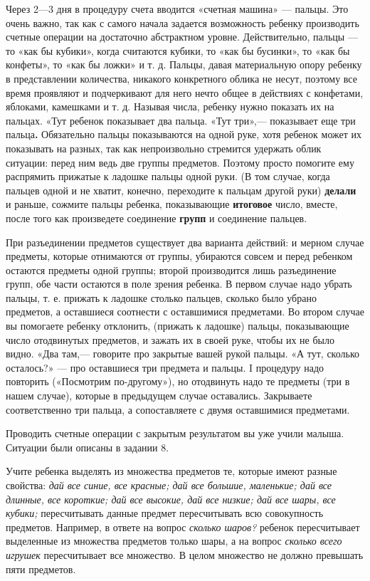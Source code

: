 \documentclass[a5paper]{book}
\renewcommand{\emph}[1]{\textit{#1}}
\begin{document}
Через 2---3 дня в процедуру счета вводится «счетная машина» --- пальцы.
Это очень важно, так как с самого начала задается возможность ребенку
производить счетные операции на достаточно абстрактном уровне.
Действительно, пальцы --- то «как бы кубики», когда считаются кубики, то
«как бы бусинки», то «как бы конфеты», то «как бы ложки» и т. д. Пальцы,
давая материальную опору ребенку в представлении количества, никакого
конкретного облика не несут, поэтому все время проявляют и подчеркивают
для него нечто общее в действиях с конфетами, яблоками, камешками и т.
д. Называя числа, ребенку нужно показать их на пальцах. «Тут ребенок
показывает два пальца. «Тут три»,--- показывает еще три пальца\textbf{.}
Обязательно пальцы показываются на одной руке, хотя ребенок может их
показывать на разных, так как непроизвольно стремится удержать облик
ситуации: перед ним ведь две группы предметов. Поэтому просто помогите
ему распрямить прижатые к ладошке пальцы одной руки. (В том случае,
когда пальцев одной и не хватит, конечно, переходите к пальцам другой
руки) \textbf{делали} и раньше, сожмите пальцы ребенка, показывающие
\textbf{итоговое} число, вместе, после того как произведете соединение
\textbf{групп} и соединение пальцев.

При разъединении предметов существует два варианта действий: и мерном
случае предметы, которые отнимаются от группы, убираются совсем и перед
ребенком остаются предметы одной группы; второй производится лишь
разъединение групп, обе части остаются в поле зрения ребенка. В первом
случае надо убрать пальцы, т. е. прижать к ладошке столько пальцев,
сколько было убрано предметов, а оставшиеся соотнести с оставшимися
предметами. Во втором случае вы помогаете ребенку отклонить, (прижать к
ладошке) пальцы, показывающие число отодвинутых предметов, и зажать их в
своей руке, чтобы их не было видно. «Два там,--- говорите про закрытые
вашей рукой пальцы. «А тут, сколько осталось?» --- про оставшиеся три
предмета и пальцы. I процедуру надо повторить («Посмотрим по-другому»),
но отодвинуть надо те предметы (три в нашем случае), которые в
предыдущем случае оставались. Закрываете соответственно три пальца, а
сопоставляете с двумя оставшимися предметами.

Проводить счетные операции с закрытым результатом вы уже учили малыша.
Ситуации были описаны в задании 8.

Учите ребенка выделять из множества предметов те, которые имеют разные
свойства: \emph{дай все синие, все красные; дай все большие, маленькие;
дай все длинные, все короткие; дай все высокие, дай все низкие; дай все
шары, все кубики;} пересчитывать данные предмет пересчитывать всю
совокупность предметов. Например, в ответе на вопрос \emph{сколько
шаров?} ребенок пересчитывает выделенные из множества предметов только
шары, а на вопрос \emph{сколько всего игрушек} пересчитывает все
множество. В целом множество не должно превышать пяти предметов.
\end{document}
